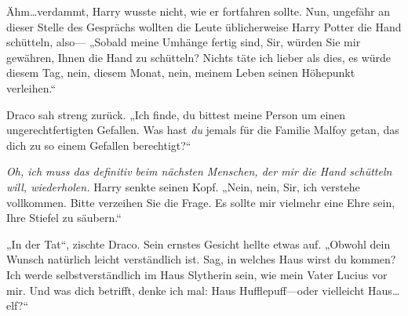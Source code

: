 Ähm…verdammt, Harry wusste nicht, wie er fortfahren sollte. Nun, ungefähr an dieser Stelle des Gesprächs wollten die Leute üblicherweise Harry Potter die Hand schütteln, also— „Sobald meine Umhänge fertig sind, Sir, würden Sie mir gewähren, Ihnen die Hand zu schütteln? Nichts täte ich lieber als dies, es würde diesem Tag, nein, diesem Monat, nein, meinem Leben seinen Höhepunkt verleihen.“

Draco sah streng zurück. „Ich finde, du bittest meine Person um einen ungerechtfertigten Gefallen. Was hast \emph{du} jemals für die Familie Malfoy getan, das dich zu so einem Gefallen berechtigt?“

\emph{Oh, ich muss das definitiv beim nächsten Menschen, der mir die Hand schütteln will, wiederholen.} Harry senkte seinen Kopf. „Nein, nein, Sir, ich verstehe vollkommen. Bitte verzeihen Sie die Frage. Es sollte mir vielmehr eine Ehre sein, Ihre Stiefel zu säubern.“

„In der Tat“, zischte Draco. Sein ernstes Gesicht hellte etwas auf. „Obwohl dein Wunsch natürlich leicht verständlich ist. Sag, in welches Haus wirst du kommen? Ich werde selbstverständlich im Haus Slytherin sein, wie mein Vater Lucius vor mir. Und was dich betrifft, denke ich mal: Haus Hufflepuff—oder vielleicht Haus…elf?“

